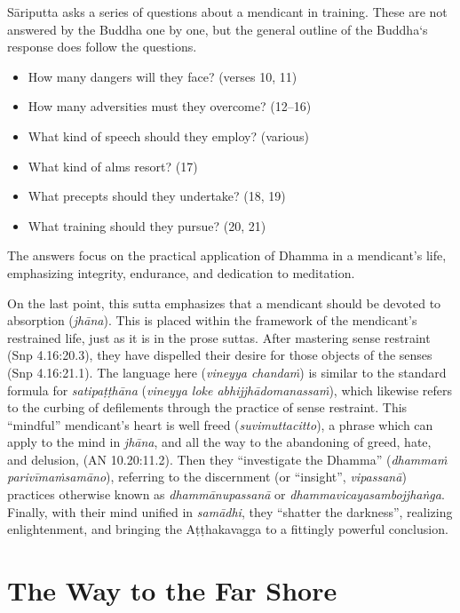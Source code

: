\documentclass[12pt,openany]{book}%
\begin{document}
\textsanskrit{Sāriputta} asks a series of questions about a mendicant in training. These are not answered by the Buddha one by one, but the general outline of the Buddha‘s response does follow the questions.

\begin{itemize}%
\item How many dangers will they face? (verses 10, 11)%
\item How many adversities must they overcome? (12–16)%
\item What kind of speech should they employ? (various)%
\item What kind of alms resort? (17)%
\item What precepts should they undertake? (18, 19)%
\item What training should they pursue? (20, 21)%
\end{itemize}

The answers focus on the practical application of Dhamma in a mendicant’s life, emphasizing integrity, endurance, and dedication to meditation.

On the last point, this sutta emphasizes that a mendicant should be devoted to absorption (\textit{\textsanskrit{jhāna}}). This is placed within the framework of the mendicant’s restrained life, just as it is in the prose suttas. After mastering sense restraint (Snp 4.16:20.3), they have dispelled their desire for those objects of the senses (Snp 4.16:21.1). The language here (\textit{vineyya \textsanskrit{chandaṁ}}) is similar to the standard formula for \textit{\textsanskrit{satipaṭṭhāna}} (\textit{vineyya loke \textsanskrit{abhijjhādomanassaṁ}}), which likewise refers to the curbing of defilements through the practice of sense restraint. This “mindful” mendicant’s heart is well freed (\textit{suvimuttacitto}), a phrase which can apply to the mind in \textit{\textsanskrit{jhāna}}, and all the way to the abandoning of greed, hate, and delusion, (AN 10.20:11.2). Then they “investigate the Dhamma” (\textit{\textsanskrit{dhammaṁ} \textsanskrit{parivīmaṁsamāno}}), referring to the discernment (or “insight”, \textit{\textsanskrit{vipassanā}}) practices otherwise known as \textit{\textsanskrit{dhammānupassanā}} or \textit{\textsanskrit{dhammavicayasambojjhaṅga}}. Finally, with their mind unified in \textit{\textsanskrit{samādhi}}, they “shatter the darkness”, realizing enlightenment, and bringing the \textsanskrit{Aṭṭhakavagga} to a fittingly powerful conclusion.

\section*{The Way to the Far Shore}
\end{document}
